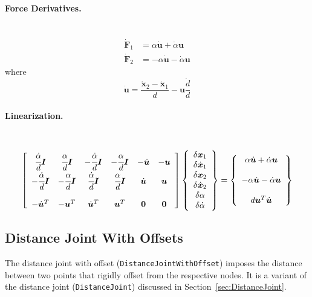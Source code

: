 \documentclass[10pt,dvips,fleqn,subeqn]{report}
\newcommand{\T}[1]{\bm{#1}}
\begin{document}
\paragraph{Force Derivatives.} \
\begin{subequations}
\begin{align}
	\dot{\T{F}}_1 &= \alpha \dot{\T{u}} + \dot{\alpha} \T{u} \\
	\dot{\T{F}}_2 &= -\alpha \dot{\T{u}} - \dot{\alpha} \T{u}
\end{align}
\end{subequations}
where
\begin{equation}
	\dot{\T{u}} = \frac{\dot{\T{x}}_2 - \dot{\T{x}}_1}{d} - \T{u} \frac{\dot{d}}{d}
\end{equation}

\paragraph{Linearization.} \
\begin{equation}
        \sqbr{\matr{cccccc}{
		\cfrac{\dot{\alpha}}{d}\T{I} & \cfrac{\alpha}{d}\T{I} &
			-\cfrac{\dot{\alpha}}{d}\T{I} & -\cfrac{\alpha}{d}\T{I} &
			-\dot{\T{u}} & -\T{u} \\
		-\cfrac{\dot{\alpha}}{d}\T{I} & -\cfrac{\alpha}{d}\T{I} &
			\cfrac{\dot{\alpha}}{d}\T{I} & \cfrac{\alpha}{d}\T{I} &
			\dot{\T{u}} & \T{u} \\
		\\
		-\dot{\T{u}}^T & -\T{u}^T & \dot{\T{u}}^T & \T{u}^T & \T{0} & \T{0}
	}}\cubr{\cvvect{
		\delta\T{x}_1 \\
		\delta\dot{\T{x}}_1 \\
		\delta\T{x}_2 \\
		\delta\dot{\T{x}}_2 \\
		\delta\alpha \\
		\delta\dot{\alpha}
	}} = \cubr{\cvvect{
		\alpha \dot{\T{u}} + \dot{\alpha} \T{u} \\
		\\
		-\alpha \dot{\T{u}} - \dot{\alpha} \T{u} \\
		\\
		d \T{u}^T \dot{\T{u}}
	}}
\end{equation}




\subsection{Distance Joint With Offsets}
\label{sec:DistanceJointWithOffset}
The distance joint with offset (\texttt{DistanceJointWithOffset}) 
imposes the distance between two points
that rigidly offset from the respective nodes.
It is a variant of the distance joint (\texttt{DistanceJoint})
discussed in Section~\ref{sec:DistanceJoint}.
\end{document}
